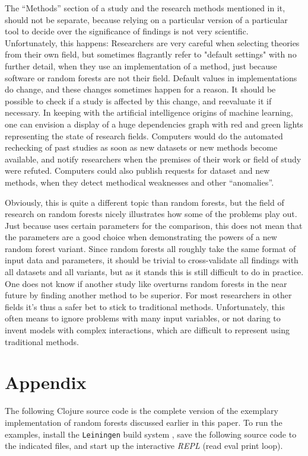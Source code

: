 \documentclass[a4paper,man,12pt,apacite,floatsintext,draftfirst]{apa6} %
\begin{document}
The “Methods” section of a study and the research methods mentioned in it,
should not be separate, because relying on a particular version of a particular
tool to decide over the significance of findings is not very scientific.
Unfortunately, this happens:
Researchers are very careful when selecting theories from their own field,
but sometimes flagrantly refer to "default settings" with no further detail,
when they use an implementation of a method,
just because software or random forests are not their field.
Default values in implementations do change, and these changes sometimes
happen for a reason.
It should be possible to check if a study is affected by this change,
and reevaluate it if necessary.
In keeping with the artificial intelligence origins of machine learning,
one can envision a display of a huge dependencies graph with
red and green lights representing the state of research fields.
Computers would do the automated rechecking of past studies as soon as
new datasets or new methods become available, and notify researchers
when the premises of their work or field of study were refuted.
Computers could also publish requests for dataset and new methods,
when they detect methodical weaknesses and other “anomalies”.

Obviously, this is quite a different topic than random forests, but the
field of research on random forests nicely illustrates how some of the
problems play out.
Just because  uses certain parameters for the
comparison, this does not mean that the parameters are a good choice when
demonstrating the powers of a new random forest variant.
Since random forests all roughly take the same format of input data and
parameters, it should be trivial to cross-validate all findings with all
datasets and all variants, but as it stands this is still difficult to do in practice.
One does not know if another study like 
overturns random forests in the near future by finding another method to be
superior.
For most researchers in other fields it's thus a safer bet to stick to
traditional methods.
Unfortunately, this often means to ignore problems with many input variables,
or not daring to invent models with complex interactions,
which are difficult to represent using traditional methods.

\newpage
\section{Appendix}
The following Clojure source code is the complete version of the
exemplary implementation of random forests discussed earlier in this paper.
To run the examples, install the \texttt{Leiningen} build system
\cite{leiningen}, save the following source code to the indicated files,
and start up the interactive \emph{REPL} (read eval print loop).
\end{document}
